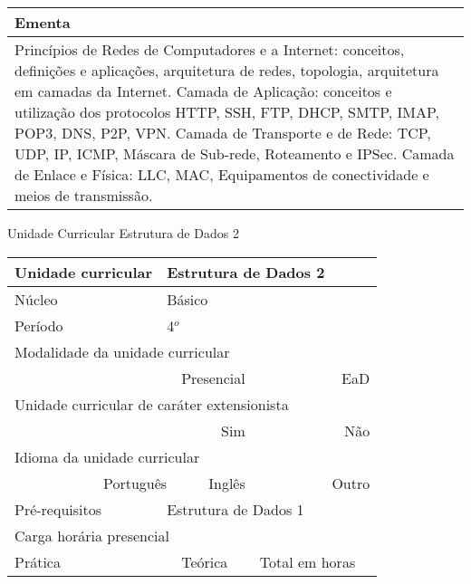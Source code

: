 \begin{quadro}[h!]
\begin{tabular}{|p{3cm} p{2cm} p{3cm} p{2cm} p{3cm} p{2cm}|}
\multicolumn{6}{|p{15cm}|}{\cellcolor{blue1} Ementa} \\\hline
\hline\multicolumn{6}{|p{15cm}|}{\scriptsize Princípios de Redes de Computadores e a Internet: conceitos, definições e aplicações, arquitetura de redes, topologia, arquitetura em camadas da Internet. Camada de Aplicação: conceitos e utilização dos protocolos HTTP, SSH, FTP, DHCP, SMTP, IMAP, POP3, DNS, P2P, VPN. Camada de Transporte e de Rede: TCP, UDP, IP, ICMP, Máscara de Sub-rede, Roteamento e IPSec. Camada de Enlace e Física: LLC, MAC, Equipamentos de conectividade e meios de transmissão.}\\\hline
\hline
	\end{tabular}
\end{quadro}
\begin{quadro}[h!]
  \centering\scriptsize
\caption{Unidade Curricular Estrutura de Dados 2}
\label{ unit_17 }
\begin{tabular}{|p{3cm} p{2cm} p{3cm} p{2cm} p{3cm} p{2cm}|}\hline
\multicolumn{1}{|p{3cm}|}{\cellcolor{blue1} Unidade curricular} & \multicolumn{5}{p{9cm}|}{ Estrutura de Dados 2 }\\\hline
\multicolumn{1}{|p{3cm}|}{\cellcolor{blue1} Núcleo} & \multicolumn{5}{p{11.5cm}|}{ Básico }\\\hline
\multicolumn{1}{|p{3cm}|}{\cellcolor{blue1} Período} & \multicolumn{5}{p{9cm}|}{ 4$^o$ }\\\hline
\multicolumn{6}{|p{15cm}|}{\cellcolor{blue1} Modalidade da unidade curricular} \\\hline
\multicolumn{2}{|r}{		} &  \multicolumn{2}{r}{Presencial \XBox } & \multicolumn{2}{r|}{EaD \Square	} \\\hline
\multicolumn{6}{|p{15cm}|}{\cellcolor{blue1} Unidade curricular de caráter extensionista} \\\hline
\multicolumn{4}{|r}{			Sim \Square	} & \multicolumn{2}{r|}{	Não \XBox	}\\\hline
\multicolumn{6}{|p{15cm}|}{\cellcolor{blue1} Idioma da unidade curricular} \\ \hline
\multicolumn{2}{|r}{	Português \XBox	} &  \multicolumn{2}{r}{	Inglês \Square	} & \multicolumn{2}{r|}{	Outro \Square	} \\ \hline
\multicolumn{1}{|p{3cm}|}{\cellcolor{blue1} Pré-requisitos} & \multicolumn{5}{p{9cm}|}{ Estrutura de Dados 1 }\\ \hline
\multicolumn{6}{|p{15cm}|}{\cellcolor{blue1} Carga horária presencial} \\ \hline
\multicolumn{1}{|p{3cm}|}{\raggedleft Prática} & \multicolumn{1}{p{1cm}|}{\centering	30	} &  \multicolumn{1}{p{3cm}|}{\raggedleft Teórica}  & \multicolumn{1}{p{1cm}|}{\centering 	30 } & \multicolumn{1}{p{3cm}|}{\raggedleft Total em horas} & \multicolumn{1}{p{1cm}|}{\raggedleft	60	} \\ \hline

\end{tabular}
\end{quadro}
